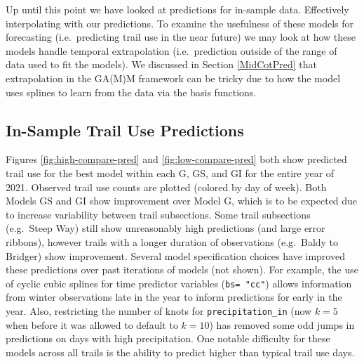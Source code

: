\documentclass[
]{book}
\begin{document}
Up until this point we have looked at predictions for in-sample data. Effectively interpolating with our predictions. To examine the usefulness of these models for forecasting (i.e.~predicting trail use in the near future) we may look at how these models handle temporal extrapolation (i.e.~prediction outside of the range of data used to fit the models). We discussed in Section \ref{MidCotPred} that extrapolation in the GA(M)M framework can be tricky due to how the model uses splines to learn from the data via the basis functions.

\hypertarget{in-sample-trail-use-predictions}{%
\subsection{In-Sample Trail Use Predictions}\label{in-sample-trail-use-predictions}}

Figures \ref{fig:high-compare-pred} and \ref{fig:low-compare-pred} both show predicted trail use for the best model within each G, GS, and GI for the entire year of 2021. Observed trail use counts are plotted (colored by day of week). Both Models GS and GI show improvement over Model G, which is to be expected due to increase variability between trail subsections. Some trail subsections (e.g.~Steep Way) still show unreasonably high predictions (and large error ribbons), however trails with a longer duration of observations (e.g.~Baldy to Bridger) show improvement. Several model specification choices have improved these predictions over past iterations of models (not shown). For example, the use of cyclic cubic splines for time predictor variables (\texttt{bs=\ "cc"}) allows information from winter observations late in the year to inform predictions for early in the year. Also, restricting the number of knots for \texttt{precipitation\_in} (now \(k=5\) when before it was allowed to default to \(k=10\)) has removed some odd jumps in predictions on days with high precipitation. One notable difficulty for these models across all trails is the ability to predict higher than typical trail use days.
\end{document}
